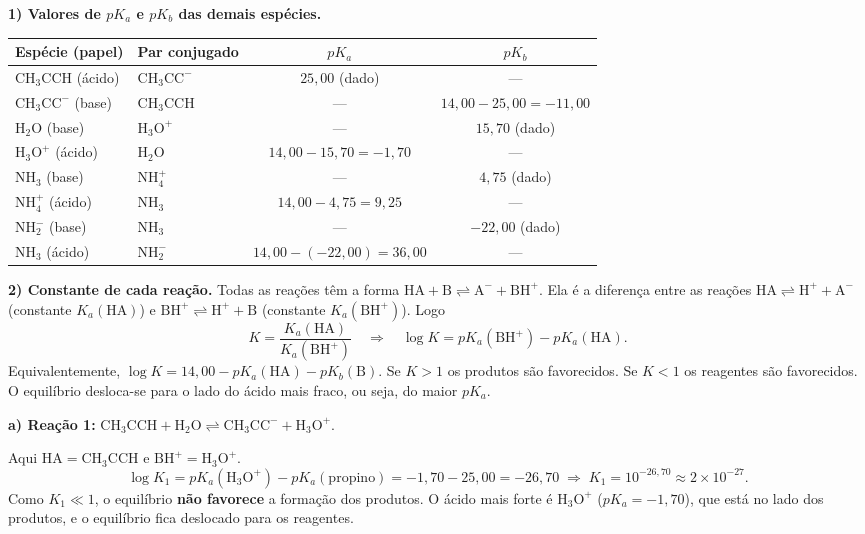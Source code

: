 \documentclass{article}%
\begin{document}
\textbf{1) Valores de $pK_a$ e $pK_b$ das demais espécies.}

\begin{center}
\begin{tabular}{llcc}
Espécie (papel) & Par conjugado & $pK_a$ & $pK_b$ \\ \hline
$\mathrm{CH_3CCH}$ (ácido) & $\mathrm{CH_3CC^-}$ & $25{,}00$ (dado) & --- \\
$\mathrm{CH_3CC^-}$ (base) & $\mathrm{CH_3CCH}$ & --- & $14{,}00-25{,}00=-11{,}00$ \\
$\mathrm{H_2O}$ (base) & $\mathrm{H_3O^+}$ & --- & $15{,}70$ (dado) \\
$\mathrm{H_3O^+}$ (ácido) & $\mathrm{H_2O}$ & $14{,}00-15{,}70=-1{,}70$ & --- \\
$\mathrm{NH_3}$ (base) & $\mathrm{NH_4^+}$ & --- & $4{,}75$ (dado) \\
$\mathrm{NH_4^+}$ (ácido) & $\mathrm{NH_3}$ & $14{,}00-4{,}75=9{,}25$ & --- \\
$\mathrm{NH_2^-}$ (base) & $\mathrm{NH_3}$ & --- & $-22{,}00$ (dado) \\
$\mathrm{NH_3}$ (ácido) & $\mathrm{NH_2^-}$ & $14{,}00-(-22{,}00)=36{,}00$ & --- \\
\end{tabular}
\end{center}

\textbf{2) Constante de cada reação.} Todas as reações têm a forma $\mathrm{HA+B\rightleftharpoons A^-+BH^+}$. Ela é a diferença entre as reações $\mathrm{HA\rightleftharpoons H^++A^-}$ (constante $K_a(\mathrm{HA})$) e $\mathrm{BH^+\rightleftharpoons H^++B}$ (constante $K_a(\mathrm{BH^+})$). Logo
\[
K=\frac{K_a(\mathrm{HA})}{K_a(\mathrm{BH^+})}
\quad\Longrightarrow\quad
\log K=pK_a(\mathrm{BH^+})-pK_a(\mathrm{HA}) .
\]
Equivalentemente, $\log K=14{,}00-pK_a(\mathrm{HA})-pK_b(\mathrm{B})$. Se $K>1$ os produtos são favorecidos. Se $K<1$ os reagentes são favorecidos. O equilíbrio desloca-se para o lado do ácido mais fraco, ou seja, do maior $pK_a$.

\textbf{a) Reação 1:} $\mathrm{CH_3CCH+H_2O\rightleftharpoons CH_3CC^-+H_3O^+}$.

Aqui $\mathrm{HA}=\mathrm{CH_3CCH}$ e $\mathrm{BH^+}=\mathrm{H_3O^+}$.
\[
\log K_1=pK_a(\mathrm{H_3O^+})-pK_a(\mathrm{propino})=-1{,}70-25{,}00=-26{,}70
\;\Rightarrow\; K_1=10^{-26,70}\approx 2\times10^{-27}.
\]
Como $K_1\ll1$, o equilíbrio \textbf{não favorece} a formação dos produtos. O ácido mais forte é $\mathrm{H_3O^+}$ ($pK_a=-1{,}70$), que está no lado dos produtos, e o equilíbrio fica deslocado para os reagentes.
\end{document}
